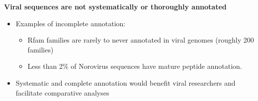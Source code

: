 \documentclass[landscape]{slides}
\begin{document}
\begin{slide}
\begin{center}
\vfill

\end{center}
\end{slide}

\begin{slide}
\begin{center}
\textbf{Viral sequences are not systematically or thoroughly annotated}
\end{center}

\small
\begin{itemize}
\item Examples of incomplete annotation: 
  \begin{itemize}
  \item Rfam families are rarely to never annotated in viral genomes
    (roughly 200 families)
  \item Less than 2\% of Norovirus sequences have mature peptide
    annotation. 
\end{itemize}
\item Systematic and complete annotation would benefit viral
  researchers and facilitate comparative analyses
\end{itemize}

\vfill
\end{slide}
\end{document}
